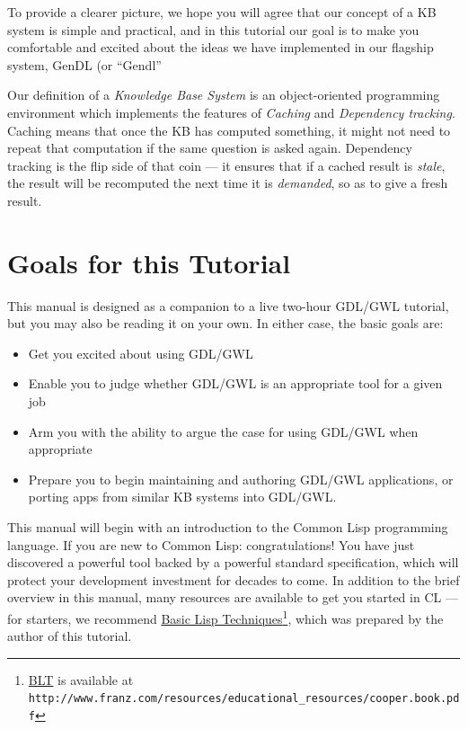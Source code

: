 \documentclass [11pt]{book}
\begin{document}
To provide a clearer picture, we hope you will agree that our concept
of a KB system is simple and practical, and in this tutorial our goal
is to make you comfortable and excited about the ideas we have
implemented in our flagship system, GenDL (or ``Gendl'' 


Our definition of a \emph{Knowledge Base System} is an object-oriented programming environment which implements the features of \emph{Caching} and \emph{Dependency tracking}. Caching means that once the KB has computed something, it might not need to repeat 
that computation if the same question is asked again. Dependency tracking is the flip side
of that coin --- it ensures that if a cached result is \emph{stale}, the result will be recomputed the next time it is \emph{demanded}, so as to give a fresh result.

\section{Goals for this Tutorial}

\label{sec:goalsforthistutorial}

This manual is designed as a companion to a live two-hour GDL/GWL tutorial, but you may
also be reading it on your own. In either case, the basic goals are:

\begin{itemize}

\item Get you excited about using GDL/GWL

\item Enable you to judge whether GDL/GWL is an appropriate tool for a given job

\item Arm you with the ability to argue the case for using GDL/GWL when appropriate

\item Prepare you to begin maintaining and authoring GDL/GWL applications, or porting apps
from similar KB systems into GDL/GWL.

\end{itemize}

This manual will begin with an introduction to the Common Lisp programming language. If you are new to Common Lisp:
congratulations! You have just discovered a powerful tool backed by a
powerful standard specification, which will protect your development
investment for decades to come. In addition to the brief overview in
this manual, many resources are available to get you started in CL ---
for starters, we recommend 
\underline{Basic Lisp Techniques}\footnote{
\underline{BLT} is available at \texttt{http://www.franz.com/resources/educational\_resources/cooper.book.pdf}}, which was prepared by the author of this tutorial. 
\end{document}
